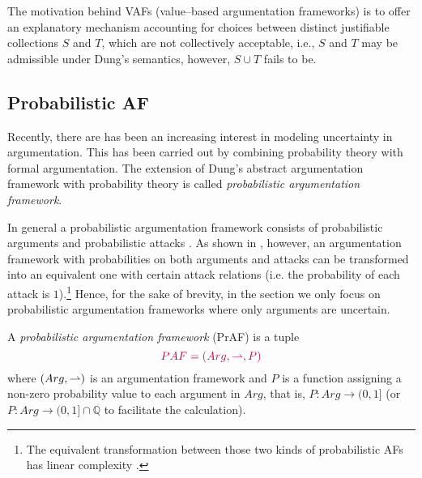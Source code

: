 The motivation behind VAFs (value--based argumentation frameworks) is to offer an explanatory mechanism accounting for choices between distinct justifiable collections $S$ and $T$, 
which are not collectively acceptable, 
i.e., $S$ and $T$ may be admissible under Dung's semantics, 
however, $S \cup T$ fails to be. 






\subsection{Probabilistic AF}

Recently, 
there are has been an increasing interest in modeling uncertainty in argumentation. 
% 
This has been carried out by combining probability theory with formal argumentation.
% 
The extension of Dung's abstract argumentation framework with probability theory is called \textit{probabilistic argumentation framework}.




In general a probabilistic argumentation framework consists of probabilistic arguments and probabilistic attacks \cite{Li.Ore.Nor2011,Faz.Fle.Par2015}.
% 
As shown in \cite{Man.Bis2020}, 
however, 
an argumentation framework with probabilities on both arguments and attacks can be transformed into an equivalent one with certain attack relations (i.e. the probability of each attack is $1$).\footnote{
    The equivalent transformation between those two kinds of probabilistic AFs has linear complexity \cite{Man.Bis2020}.
}
Hence, 
for the sake of brevity, 
in the section we only focus on probabilistic argumentation frameworks where only arguments are uncertain.





\begin{df}
    A \textit{probabilistic argumentation framework} (PrAF) is a tuple 
    \[
        {\color{purple} PAF = (Arg,\rightharpoonup,P)}
    \]
    where $(Arg,\rightharpoonup)$ is an argumentation framework and
    $P$ is a function assigning a non-zero probability value to each argument in $Arg$,
    that is,
    $P \colon Arg \to (0,1]$ 
    (or $P \colon Arg \to (0,1] \cap \mathbb{Q}$ to facilitate the calculation). 
\end{df}



